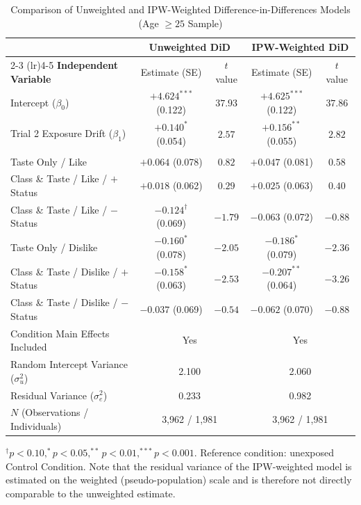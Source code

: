 \begin{table}[ht!]
\centering
\small
\caption{Comparison of Unweighted and IPW-Weighted Difference-in-Differences Models (Age $\ge 25$ Sample)}
\label{tbl:appendix_did_compare}
\setlength{\tabcolsep}{4.5pt}
\begin{tabular*}{\linewidth}{@{\extracolsep{\fill}}lcccc@{}}
\toprule
 & \multicolumn{2}{c}{\textbf{Unweighted DiD}} & \multicolumn{2}{c}{\textbf{IPW-Weighted DiD}} \\
\cmidrule(lr){2-3} \cmidrule(lr){4-5}
\textbf{Independent Variable} & Estimate (SE) & $t$ value & Estimate (SE) & $t$ value \\
\midrule
Intercept ($\beta_0$) & $+4.624^{***}$ (0.122) & $37.93$ & $+4.625^{***}$ (0.122) & $37.86$ \\
Trial 2 Exposure Drift ($\beta_{1}$) & $+0.140^{\ast}$ (0.054) & $2.57$ & $+0.156^{**}$ (0.055) & $2.82$ \\
\addlinespace[3pt]
\multicolumn{5}{l}{\textit{Difference-in-Differences Treatment Effects ($\text{Trial} \times \text{Condition}$):}} \\
\quad Taste Only / Like & $+0.064$ (0.078) & $0.82$ & $+0.047$ (0.081) & $0.58$ \\
\quad Class \& Taste / Like / $+$Status & $+0.018$ (0.062) & $0.29$ & $+0.025$ (0.063) & $0.40$ \\
\quad Class \& Taste / Like / $-$Status & $-0.124^{\dagger}$ (0.069) & $-1.79$ & $-0.063$ (0.072) & $-0.88$ \\
\quad Taste Only / Dislike & $-0.160^{\ast}$ (0.078) & $-2.05$ & $-0.186^{\ast}$ (0.079) & $-2.36$ \\
\quad Class \& Taste / Dislike / $+$Status & $-0.158^{\ast}$ (0.063) & $-2.53$ & $-0.207^{**}$ (0.064) & $-3.26$ \\
\quad Class \& Taste / Dislike / $-$Status & $-0.037$ (0.069) & $-0.54$ & $-0.062$ (0.070) & $-0.88$ \\
\addlinespace[3pt]
Condition Main Effects Included & \multicolumn{2}{c}{Yes} & \multicolumn{2}{c}{Yes} \\
Random Intercept Variance ($\sigma^2_u$) & \multicolumn{2}{c}{2.100} & \multicolumn{2}{c}{2.060} \\
Residual Variance ($\sigma^2_e$) & \multicolumn{2}{c}{0.233} & \multicolumn{2}{c}{0.982} \\
$N$ (Observations / Individuals) & \multicolumn{2}{c}{3,962 / 1,981} & \multicolumn{2}{c}{3,962 / 1,981} \\
\bottomrule
\end{tabular*}
\begin{minipage}{\linewidth}
\vspace{4pt}
\footnotesize
$^{\dagger}p < 0.10, ^{*}p < 0.05, ^{**}p < 0.01, ^{***}p < 0.001$. Reference condition: unexposed Control Condition. Note that the residual variance of the IPW-weighted model is estimated on the weighted (pseudo-population) scale and is therefore not directly comparable to the unweighted estimate.
\end{minipage}
\end{table}
